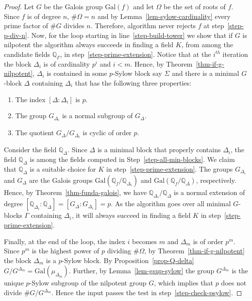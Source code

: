 \documentclass[prodmod,acmtalg]{acmsmall}
\newcommand{\Gal}[1]{{\ensuremath{\mathrm{Gal}\left(#1\right)}}}
\newcommand{\Q}{\ensuremath{\mathbb{Q}}}
\begin{document}
\begin{proof}
  Let $G$ be the Galois group $\Gal{f}$ and let $\Omega$ be the set of
  roots of $f$.  Since $f$ is of degree $n$, $\# \Omega = n$ and by
  Lemma~\ref{lem-sylow-cardinality} every prime factor of $\# G$
  divides $n$.  Therefore, algorithm never rejects $f$ at
  step~\ref{step-p-div-n}. Now, for the loop starting in
  line~\ref{step-build-tower} we show that if $G$ is nilpotent the
  algorithm always succeeds in finding a field $K$, from among the
  candidate fields $\Q_\Gamma$, in
  step~\ref{step-prime-extension}. Notice that at the $i^{th}$
  iteration the block $\Delta_i$ is of cardinality $p^i$ and $i<
  m$. Hence, by Theorem~\ref{thm-if-g-nilpotent}, $\Delta_i$ is
  contained in some $p$-Sylow block say $\Sigma$ and there is a
  minimal $G$-block $\Delta$ containing $\Delta_i$ that has the
  following three properties:
  \begin{enumerate}
  \item The index $[\Delta:\Delta_i]$ is  $p$.
  \item The group $G_{\Delta_i}$ is a normal subgroup of $G_\Delta$.
  \item The quotient $G_{\Delta}/G_{\Delta_i}$ is cyclic of order $p$.
  \end{enumerate}

  Consider the field $\Q_\Delta$. Since $\Delta$ is a minimal block
  that properly contains $\Delta_i$, the field $\Q_\Delta$ is among
  the fields computed in Step~\ref{step-all-min-blocks}. We claim that
  $\Q_\Delta$ is a suitable choice for $K$ in
  step~\ref{step-prime-extension}. The groups $G_{\Delta_i}$ and
  $G_\Delta$ are the Galois groups $\Gal{\Q_f/\Q_{\Delta_i}}$ and
  $\Gal{\Q_f/\Q_\Delta}$, respectively. Hence, by
  Theorem~\ref{thm-funda-galois}, we have $\Q_{\Delta_i}/\Q_\Delta$ is
  a normal extension of degree $[\Q_{\Delta_i}:\Q_\Delta] =
  [G_\Delta:G_{\Delta_i}] = p$. As the algorithm goes over all minimal
  $G$-blocks $\Gamma$ containing $\Delta_{i}$, it will always succeed
  in finding a field $K$ in step~\ref{step-prime-extension}.

  Finally, at the end of the loop, the index $i$ becomes $m$ and
  $\Delta_m$ is of order $p^m$. Since $p^m$ is the highest power of
  $p$ dividing $\# \Omega$, by Theorem~\ref{thm-if-g-nilpotent} the
  block $\Delta_m$ is a $p$-Sylow block. By
  Proposition~\ref{prop-Q-delta}
  $G/G^{\Delta_m}=\Gal{\mu_{\Delta_m}}$.  Further, by
  Lemma~\ref{lem-gsup-sylow} the group $G^{\Delta_m}$ is the unique
  $p$-Sylow subgroup of the nilpotent group $G$, which implies that
  $p$ does not divide $\# G/G^{\Delta_m}$. Hence the input passes the
  test in step~\ref{step-check-psylow}.
\end{proof}
\end{document}
